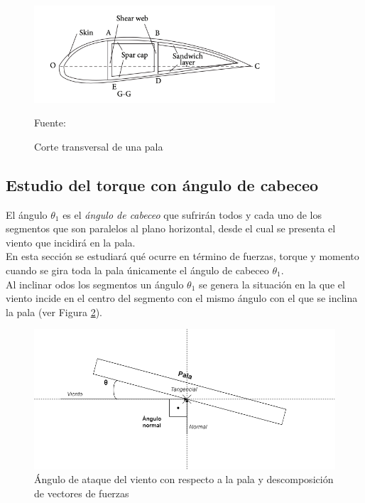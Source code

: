     \begin{figure}[H]
    \centering
    \includegraphics[width=0.8\textwidth]{images/Cross secction pala articulo.png}
    \caption{Corte transversal de una pala}
    Fuente: \cite{Zheng2014}
    \label{fig:corte_transversal_pala}
    \end{figure}





\subsection{Estudio del torque con ángulo de cabeceo}
\label{section:torque_giro_inicial}

El ángulo $ \theta_1 $ es el \textit{ángulo de cabeceo} que sufrirán todos y cada uno de los segmentos que son paralelos al plano horizontal, desde el cual se presenta el viento que incidirá en la pala.\\


En esta sección se estudiará qué ocurre en término de fuerzas, torque y momento cuando se gira toda la pala únicamente el ángulo de cabeceo $ \theta_1 $. \\


Al inclinar odos los segmentos un ángulo $ \theta_1 $ se genera la situación en la que el viento incide en el centro del segmento con el mismo ángulo con el que se inclina la pala (ver Figura \ref{fig:dibujo_fuerzas}). \\

\begin{figure}[H]
    \centering
    \includegraphics[width=1\textwidth]{images/dibujo fuerzas.drawio.png}
    \caption{Ángulo de ataque del viento con respecto a la pala y descomposición de vectores de fuerzas}
    
    \label{fig:dibujo_fuerzas}
\end{figure}

